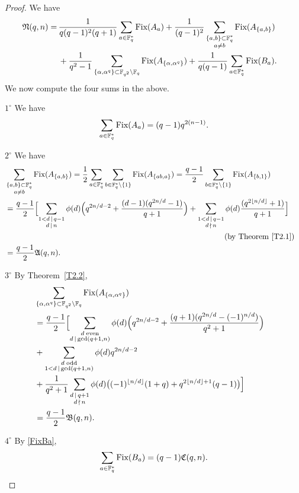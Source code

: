 \documentclass{amsart}
\numberwithin{equation}{section}
\theoremstyle{definition}
\newcommand{\f}{\Bbb F}
\begin{document}
\begin{proof}
We have
\begin{align*}
\frak N(q,n)=\,&\frac 1{q(q-1)^2(q+1)}\sum_{a\in\f_q^*}\text{Fix}(A_a)+\frac 1{(q-1)^2}\sum_{\substack{\{a,b\}\subset\f_q^*\cr a\ne b}}\text{Fix}(A_{\{a,b\}})\cr
&+\frac 1{q^2-1}\sum_{\{\alpha,\alpha^q\}\subset\f_{q^2}\setminus\f_q}\text{Fix}(A_{\{\alpha,\alpha^q\}})+\frac 1{q(q-1)}\sum_{a\in\f_q^*}\text{Fix}(B_a).
\end{align*}
We now compute the four sums in the above. 

\medskip
$1^\circ$ We have
\[
\sum_{a\in\f_q^*}\text{Fix}(A_a)=(q-1)q^{2(n-1)}.
\]

\medskip
$2^\circ$ We have
\begin{align*}
&\sum_{\substack{\{a,b\}\subset\f_q^*\cr a\ne b}}\text{Fix}(A_{\{a,b\}})=\frac 12\sum_{a\in\f_q^*}\sum_{b\in\f_q^*\setminus\{1\}}\text{Fix}(A_{\{ab,a\}})=\frac{q-1}2\sum_{b\in\f_q^*\setminus\{1\}}\text{Fix}(A_{\{b,1\}})\cr
&=\frac{q-1}2\Bigl[\sum_{\substack{1<d\,\mid\, q-1\cr d\,\mid\, n}}\phi(d)\Bigl(q^{2n/d-2}+\frac{(d-1)(q^{2n/d}-1)}{q+1}\Bigr)+\sum_{\substack{1<d\,\mid\, q-1\cr d\,\nmid\, n}}\phi(d)\frac{(q^{2\lfloor n/d\rfloor}+1)}{q+1}\Bigr]\cr
&\kern28em \text{(by Theorem~\ref{T2.1})}\cr
&=\frac{q-1}2\frak A(q,n).
\end{align*}

\medskip
$3^\circ$ By Theorem~\ref{T2.2}, 
\begin{align*}
&\sum_{\{\alpha,\alpha^q\}\subset\f_{q^2}\setminus\f_q}\text{Fix}(A_{\{\alpha,\alpha^q\}})\cr
&=\frac{q-1}2\Bigl[
\sum_{\substack{d\; \text{even}\cr d\,\mid\,\text{gcd}(q+1,n)}}\phi(d)\Bigl(q^{2n/d-2}+\frac{(q+1)(q^{2n/d}-(-1)^{n/d})}{q^2+1}\Bigr)\cr
&+\sum_{\substack{d\; \text{odd}\cr 1<d\,\mid\,\text{gcd}(q+1,n)}}\phi(d)q^{2n/d-2}\cr
&+\frac 1{q^2+1}\sum_{\substack{d\,\mid\, q+1\cr d\,\nmid\, n}}\phi(d)\bigl((-1)^{\lfloor n/d\rfloor}(1+q)+q^{2\lfloor n/d\rfloor+1}(q-1)\bigr)
\Big]\cr
&=\frac{q-1}2\frak B(q,n).
\end{align*}

\medskip
$4^\circ$ By \eqref{FixBa},
\[
\sum_{a\in\f_q^*}\text{Fix}(B_a)=(q-1)\frak C(q,n).
\]
\end{proof}

\end{document}

